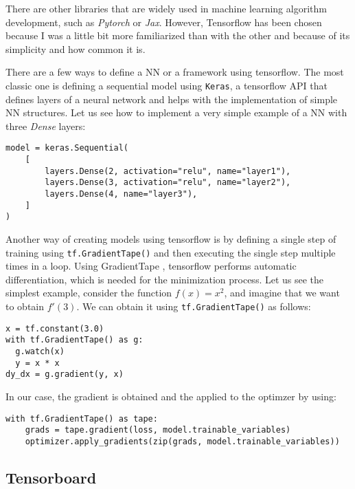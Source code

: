 There are other libraries that are widely used in machine learning algorithm development, such as \emph{Pytorch} or \emph{Jax}. However, Tensorflow has been chosen because I was a little bit more familiarized than with the other and because of its simplicity and how common it is. 

There are a few ways to define a NN or a framework using tensorflow. The most classic one is defining a sequential model using \lstinline{Keras}, a tensorflow API that defines layers of a neural network and helps with the implementation of simple NN structures. Let us see how to implement a very simple example of a NN with three \emph{Dense} layers: 

\begin{verbatim}
model = keras.Sequential(
    [
        layers.Dense(2, activation="relu", name="layer1"),
        layers.Dense(3, activation="relu", name="layer2"),
        layers.Dense(4, name="layer3"),
    ]
)
\end{verbatim}

Another way of creating models using tensorflow is by defining a single step of training using \lstinline{tf.GradientTape()} and then executing the single step multiple times in a loop. Using GradientTape , tensorflow performs automatic differentiation, which is needed for the minimization process. Let us see the simplest example, consider the function $f(x) = x^2$, and imagine that we want to obtain $f'(3)$. We can obtain it using \lstinline{tf.GradientTape()} as follows:

\begin{verbatim}
x = tf.constant(3.0)
with tf.GradientTape() as g:
  g.watch(x)
  y = x * x
dy_dx = g.gradient(y, x)
\end{verbatim}

In our case, the gradient is obtained and the applied to the optimzer by using:

\begin{verbatim}
with tf.GradientTape() as tape:
    grads = tape.gradient(loss, model.trainable_variables)
    optimizer.apply_gradients(zip(grads, model.trainable_variables))
\end{verbatim}


\subsection{Tensorboard}

